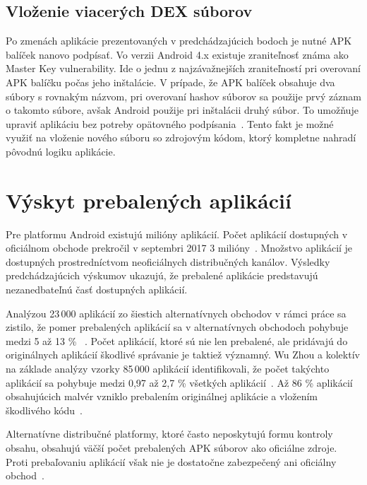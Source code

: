 \subsection*{Vloženie viacerých DEX súborov}
Po zmenách aplikácie prezentovaných v predchádzajúcich bodoch je nutné APK balíček nanovo podpísať. Vo verzii Android 4.x existuje zraniteľnosť známa ako Master Key vulnerability. Ide o jednu z najzávažnejších zraniteľností pri overovaní APK balíčku počas jeho inštalácie. V prípade, že APK balíček obsahuje dva súbory s rovnakým názvom, pri overovaní hashov súborov sa použije prvý záznam o takomto súbore, avšak Android použije pri inštalácii druhý súbor. To umožňuje upraviť aplikáciu bez potreby opätovného podpísania~\cite{c2gYRVCI9leJhfOJ}. Tento fakt je možné využiť na vloženie nového súboru so zdrojovým kódom, ktorý kompletne nahradí pôvodnú logiku aplikácie.

\section{Výskyt prebalených aplikácií}
Pre platformu Android existujú milióny aplikácií. Počet aplikácií dostupných v oficiálnom obchode  prekročil v septembri 2017 3 milióny~\cite{Statista}. Množstvo aplikácií je dostupných prostredníctvom neoficiálnych distribučných kanálov.  Výsledky predchádzajúcich výskumov ukazujú, že prebalené aplikácie predstavujú nezanedbateľnú časť dostupných aplikácií.

Analýzou 23\,000 aplikácií zo šiestich alternatívnych obchodov v rámci práce  sa zistilo, že pomer prebalených aplikácií sa v alternatívnych obchodoch pohybuje medzi 5 až 13 \% ~\cite{DetectingRepackagedZhou}.
Počet aplikácií, ktoré sú nie len prebalené, ale pridávajú do originálnych aplikácií škodlivé správanie je taktiež významný. Wu Zhou a kolektív na základe analýzy vzorky 85\,000 aplikácií identifikovali, že počet takýchto aplikácií sa pohybuje medzi 0,97 až 2,7 \% všetkých aplikácií~\cite{Zhou2013}.
Až 86 \% aplikácií obsahujúcich malvér vzniklo prebalením originálnej aplikácie a vložením škodlivého kódu~\cite{androidThreats}.

Alternatívne distribučné platformy, ktoré často neposkytujú formu kontroly obsahu, obsahujú väčší počet prebalených APK súborov ako oficiálne zdroje. Proti prebaľovaniu aplikácií však nie je dostatočne zabezpečený ani oficiálny obchod~\cite{Zhauniarovich2013}. 
